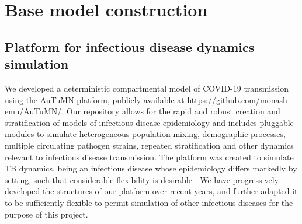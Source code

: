 \section{Base model construction}
\subsection{Platform for infectious disease dynamics simulation}

We developed a deterministic compartmental model of COVID-19 transmission using the AuTuMN platform,
publicly available at https://github.com/monash-emu/AuTuMN/.
Our repository allows for the rapid and robust creation and stratification of models of infectious disease epidemiology
and includes pluggable modules to simulate heterogeneous population mixing, demographic processes, multiple circulating
pathogen strains, repeated stratification and other dynamics relevant to infectious disease transmission.
The platform was created to simulate TB dynamics, being an infectious disease whose epidemiology differs markedly
by setting, such that considerable flexibility is desirable \cite{RN58}.
We have progressively developed the structures of our platform over recent years,
and further adapted it to be sufficiently flexible
to permit simulation of other infectious diseases for the purpose of this project.